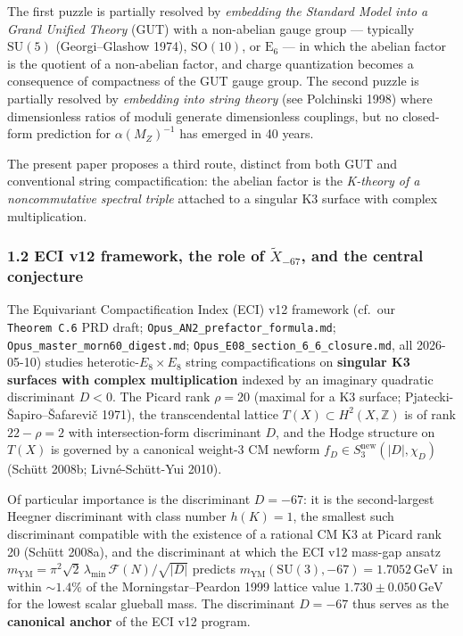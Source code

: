 \documentclass[
  11pt,
  a4paper,
]{article}
\begin{document}
The first puzzle is partially resolved by \emph{embedding the Standard Model into a Grand Unified Theory} (GUT) with a non-abelian gauge group --- typically \(\mathrm{SU}(5)\) (Georgi--Glashow 1974), \(\mathrm{SO}(10)\), or \(\mathrm{E}_6\) --- in which the abelian factor is the quotient of a non-abelian factor, and charge quantization becomes a consequence of compactness of the GUT gauge group. The second puzzle is partially resolved by \emph{embedding into string theory} (see Polchinski 1998) where dimensionless ratios of moduli generate dimensionless couplings, but no closed-form prediction for \(\alpha(M_Z)^{-1}\) has emerged in 40 years.

The present paper proposes a third route, distinct from both GUT and conventional string compactification: the abelian factor is the \emph{K-theory of a noncommutative spectral triple} attached to a singular K3 surface with complex multiplication.

\hypertarget{eci-v12-framework-the-role-of-tilde-x_-67-and-the-central-conjecture}{%
\subsubsection{\texorpdfstring{1.2 ECI v12 framework, the role of \(\tilde X_{-67}\), and the central conjecture}{1.2 ECI v12 framework, the role of \textbackslash tilde X\_\{-67\}, and the central conjecture}}\label{eci-v12-framework-the-role-of-tilde-x_-67-and-the-central-conjecture}}

The Equivariant Compactification Index (ECI) v12 framework (cf.~our \texttt{Theorem\ C.6} PRD draft; \texttt{Opus\_AN2\_prefactor\_formula.md}; \texttt{Opus\_master\_morn60\_digest.md}; \texttt{Opus\_E08\_section\_6\_6\_closure.md}, all 2026-05-10) studies heterotic-\(E_8 \times E_8\) string compactifications on \textbf{singular K3 surfaces with complex multiplication} indexed by an imaginary quadratic discriminant \(D < 0\). The Picard rank \(\rho = 20\) (maximal for a K3 surface; Pjatecki-Šapiro--Šafarevič 1971), the transcendental lattice \(T(X) \subset H^2(X, \mathbb{Z})\) is of rank \(22 - \rho = 2\) with intersection-form discriminant \(D\), and the Hodge structure on \(T(X)\) is governed by a canonical weight-3 CM newform \(f_D \in S_3^{\mathrm{new}}(|D|, \chi_D)\) (Schütt 2008b; Livné-Schütt-Yui 2010).

Of particular importance is the discriminant \(D = -67\): it is the second-largest Heegner discriminant with class number \(h(K) = 1\), the smallest such discriminant compatible with the existence of a rational CM K3 at Picard rank 20 (Schütt 2008a), and the discriminant at which the ECI v12 mass-gap ansatz \(m_{\mathrm{YM}} = \pi^2\sqrt{2}\,\lambda_{\min}\,\mathcal{F}(N)/\sqrt{|D|}\) predicts \(m_{\mathrm{YM}}(\mathrm{SU}(3), -67) = 1.7052\,\mathrm{GeV}\) in within \(\sim 1.4\%\) of the Morningstar--Peardon 1999 lattice value \(1.730 \pm 0.050\,\mathrm{GeV}\) for the lowest scalar glueball mass. The discriminant \(D = -67\) thus serves as the \textbf{canonical anchor} of the ECI v12 program.
\end{document}
